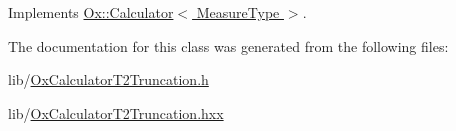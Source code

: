 Implements \hyperlink{class_ox_1_1_calculator_a01267c4e842b35f7eacaa9aacdd7e766}{Ox\-::\-Calculator$<$ Measure\-Type $>$}.



The documentation for this class was generated from the following files\-:\begin{DoxyCompactItemize}
\item 
lib/\hyperlink{_ox_calculator_t2_truncation_8h}{Ox\-Calculator\-T2\-Truncation.\-h}\item 
lib/\hyperlink{_ox_calculator_t2_truncation_8hxx}{Ox\-Calculator\-T2\-Truncation.\-hxx}\end{DoxyCompactItemize}
